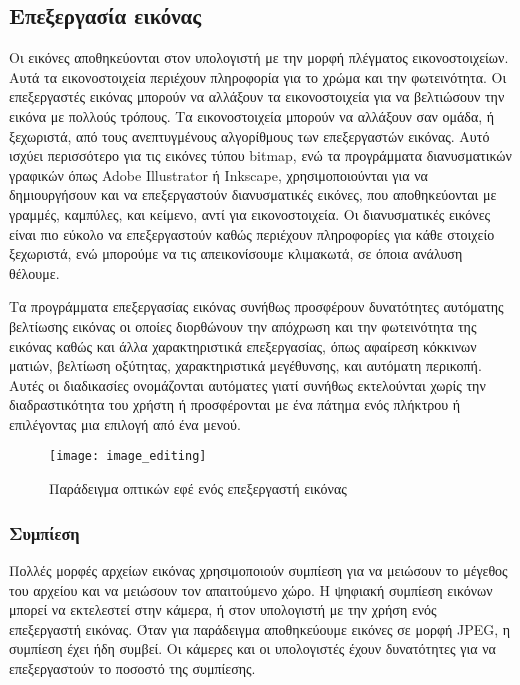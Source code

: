 \subsection{Επεξεργασία εικόνας}
Οι εικόνες αποθηκεύονται στον υπολογιστή με την μορφή πλέγματος εικονοστοιχείων. Αυτά τα εικονοστοιχεία περιέχουν πληροφορία για το χρώμα και την φωτεινότητα. Οι επεξεργαστές εικόνας μπορούν να αλλάξουν τα εικονοστοιχεία για να βελτιώσουν την εικόνα με πολλούς τρόπους. Τα εικονοστοιχεία μπορούν να αλλάξουν σαν ομάδα, ή ξεχωριστά, από τους ανεπτυγμένους αλγορίθμους των επεξεργαστών εικόνας. Αυτό ισχύει περισσότερο για τις εικόνες τύπου bitmap, ενώ τα προγράμματα διανυσματικών γραφικών όπως Adobe Illustrator ή Inkscape, χρησιμοποιούνται για να δημιουργήσουν και να επεξεργαστούν διανυσματικές εικόνες, που αποθηκεύονται με γραμμές, καμπύλες, και κείμενο, αντί για εικονοστοιχεία. Οι διανυσματικές εικόνες είναι πιο εύκολο να επεξεργαστούν καθώς περιέχουν πληροφορίες για κάθε στοιχείο ξεχωριστά, ενώ μπορούμε να τις απεικονίσουμε κλιμακωτά, σε όποια ανάλυση θέλουμε.\cite{imageediting-1}

Τα προγράμματα επεξεργασίας εικόνας συνήθως προσφέρουν δυνατότητες αυτόματης βελτίωσης εικόνας οι οποίες διορθώνουν την απόχρωση και την φωτεινότητα της εικόνας καθώς και άλλα χαρακτηριστικά επεξεργασίας, όπως αφαίρεση κόκκινων ματιών, βελτίωση οξύτητας, χαρακτηριστικά μεγέθυνσης, και αυτόματη περικοπή. Αυτές οι διαδικασίες ονομάζονται αυτόματες γιατί συνήθως εκτελούνται χωρίς την διαδραστικότητα του χρήστη ή προσφέρονται με ένα πάτημα ενός πλήκτρου ή επιλέγοντας μια επιλογή από ένα μενού.

\begin{figure}[h]
\centering
\texttt{[image: image\_editing]}
\caption{Παράδειγμα οπτικών εφέ ενός επεξεργαστή εικόνας\cite{figure-18}}
\end{figure}

\subsubsection{Συμπίεση}
Πολλές μορφές αρχείων εικόνας χρησιμοποιούν συμπίεση για να μειώσουν το μέγεθος του αρχείου και να μειώσουν τον απαιτούμενο χώρο. Η ψηφιακή συμπίεση εικόνων μπορεί να εκτελεστεί στην κάμερα, ή στον υπολογιστή με την χρήση ενός επεξεργαστή εικόνας. Όταν για παράδειγμα αποθηκεύουμε εικόνες σε μορφή JPEG, η συμπίεση έχει ήδη συμβεί. Οι κάμερες και οι υπολογιστές έχουν δυνατότητες για να επεξεργαστούν το ποσοστό της συμπίεσης.

